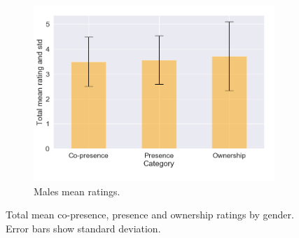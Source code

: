 \begin{figure}[H]
\begin{subfigure}[b]{0.5\textwidth}
 \end{subfigure}
  \hspace{10mm}
\begin{subfigure}[b]{1\textwidth}
 \centering
 \includegraphics[scale=0.45]{Files/Plots/misc_all_mean_m.png}
 \caption{Males mean ratings.}
 \label{fig:miscAllMales}
 \end{subfigure}
 \caption{Total mean co-presence, presence and ownership ratings by gender. Error bars show standard deviation. }
\label{fig:miscAllGendered}
\end{figure}



